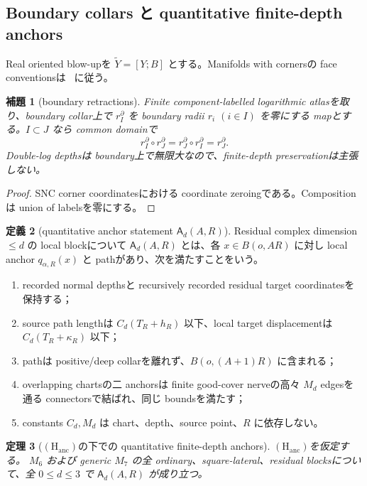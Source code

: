 \documentclass[11pt,a4paper]{ltjsarticle}
\newcommand{\wt}{\widetilde}\newcommand{\eps}{\varepsilon}\newcommand{\om}{\omega}
\newcommand{\Hanc}{\ensuremath{(\mathrm H_{\mathrm{anc}})}}
\theoremstyle{plain}
\newtheorem{theorem}{定理}[section]\newtheorem{proposition}[theorem]{命題}
\newtheorem{lemma}[theorem]{補題}\newtheorem{corollary}[theorem]{系}
\theoremstyle{definition}
\newtheorem{definition}[theorem]{定義}\newtheorem{hypothesis}[theorem]{仮定}
\theoremstyle{remark}
\begin{document}
\subsection{Boundary collars と quantitative finite-depth anchors}
Real oriented blow-upを $\wt Y=[Y;B]$ とする。Manifolds with cornersの face conventionsは~\cite{JoyceCorners} に従う。

\begin{lemma}[boundary retractions]\label{lem:boundary-retractions}
Finite component-labelled logarithmic atlasを取り、boundary collar上で $r_I^{\partial}$ を boundary radii $r_i$ $(i\in I)$ を零にする mapとする。$I\subset J$ なら common domainで
\[
 r_I^{\partial}\circ r_J^{\partial}
 =r_J^{\partial}\circ r_I^{\partial}=r_J^{\partial}.
\]
Double-log depthsは boundary上で無限大なので、finite-depth preservationは主張しない。
\end{lemma}

\begin{proof}
SNC corner coordinatesにおける coordinate zeroingである。Compositionは union of labelsを零にする。
\end{proof}

\begin{definition}[quantitative anchor statement $\mathsf A_d(A,R)$]\label{def:anchor-induction}
Residual complex dimension $\le d$ の local blockについて $\mathsf A_d(A,R)$ とは、各 $x\in B(o,AR)$ に対し local anchor $q_{\alpha,R}(x)$ と pathがあり、次を満たすことをいう。
\begin{enumerate}[label=(A\arabic*)]
 \item recorded normal depthsと recursively recorded residual target coordinatesを保持する；
 \item source path lengthは $C_d(T_R+h_R)$ 以下、local target displacementは $C_d(T_R+\kappa_R)$ 以下；
 \item pathは positive/deep collarを離れず、$B(o,(A+1)R)$ に含まれる；
 \item overlapping chartsの二 anchorsは finite good-cover nerveの高々 $M_d$ edgesを通る connectorsで結ばれ、同じ boundsを満たす；
 \item constants $C_d,M_d$ は chart、depth、source point、$R$ に依存しない。
\end{enumerate}
\end{definition}

\begin{theorem}[\Hanc の下での quantitative finite-depth anchors]\label{thm:quantitative-anchors}
\Hanc を仮定する。
$M_6$ および generic $M_7$ の全 ordinary、square-lateral、residual blocksについて、全 $0\le d\le3$ で $\mathsf A_d(A,R)$ が成り立つ。
\end{theorem}
\end{document}
